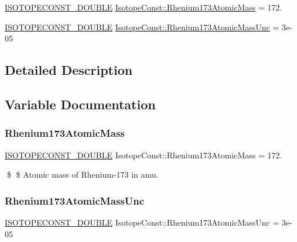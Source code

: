 \begin{DoxyCompactItemize}
\item 
\mbox{\hyperlink{group___isotope_const-_macros_ga8f45a7272ce02c0b4c65c44636ed719a}{I\+S\+O\+T\+O\+P\+E\+C\+O\+N\+S\+T\+\_\+\+D\+O\+U\+B\+LE}} \mbox{\hyperlink{group___isotope_const-_rhenium-_re173_ga484b67f551985b9d4db8d48de7d82b65}{Isotope\+Const\+::\+Rhenium173\+Atomic\+Mass}} = 172.
\item 
\mbox{\hyperlink{group___isotope_const-_macros_ga8f45a7272ce02c0b4c65c44636ed719a}{I\+S\+O\+T\+O\+P\+E\+C\+O\+N\+S\+T\+\_\+\+D\+O\+U\+B\+LE}} \mbox{\hyperlink{group___isotope_const-_rhenium-_re173_ga7ffa1dd20a43f343607ef85bf52373a5}{Isotope\+Const\+::\+Rhenium173\+Atomic\+Mass\+Unc}} = 3e-\/05
\end{DoxyCompactItemize}


\subsection{Detailed Description}


\subsection{Variable Documentation}
\mbox{\label{group___isotope_const-_rhenium-_re173_ga484b67f551985b9d4db8d48de7d82b65}} 
\subsubsection{\texorpdfstring{Rhenium173\+Atomic\+Mass}{Rhenium173AtomicMass}}
{\footnotesize\ttfamily \mbox{\hyperlink{group___isotope_const-_macros_ga8f45a7272ce02c0b4c65c44636ed719a}{I\+S\+O\+T\+O\+P\+E\+C\+O\+N\+S\+T\+\_\+\+D\+O\+U\+B\+LE}} Isotope\+Const\+::\+Rhenium173\+Atomic\+Mass = 172.}

\$ \$ Atomic mass of Rhenium-\/173 in amu. \mbox{\label{group___isotope_const-_rhenium-_re173_ga7ffa1dd20a43f343607ef85bf52373a5}} 
\subsubsection{\texorpdfstring{Rhenium173\+Atomic\+Mass\+Unc}{Rhenium173AtomicMassUnc}}
{\footnotesize\ttfamily \mbox{\hyperlink{group___isotope_const-_macros_ga8f45a7272ce02c0b4c65c44636ed719a}{I\+S\+O\+T\+O\+P\+E\+C\+O\+N\+S\+T\+\_\+\+D\+O\+U\+B\+LE}} Isotope\+Const\+::\+Rhenium173\+Atomic\+Mass\+Unc = 3e-\/05}

